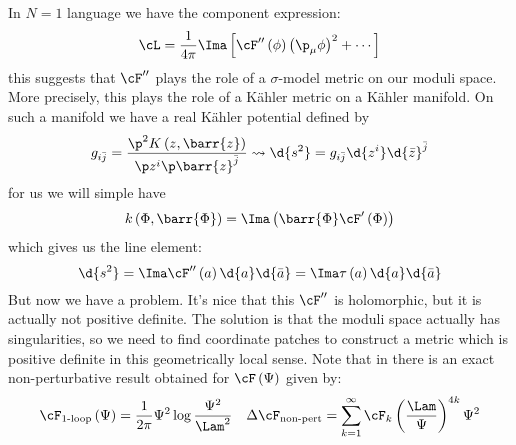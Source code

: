 \documentclass{booc}
\begin{document}
In $N = 1$ language we have the component expression:
\begin{equation}
\cL = \frac{1}{4\pi} \Ima\left[ \cF''\left( \phi \right)\left( \p_\mu \phi \right)^2 + \cdots \right]
\end{equation}
this suggests that $\cF''$ plays the role of a $\sigma$-model
metric on our moduli space.
More precisely, this plays the role of a K\"ahler metric on a K\"ahler manifold. 
On such a manifold we have a real K\"ahler potential defined by
\begin{equation}
g_{i\bar j} = \frac{\p^2 K\left( z, \barr{z} \right)}{\p z^i \p\barr{z}^{\bar j}}
\leadsto
\d{s^2} = g_{i\bar j} \d{z^i} \d{\bar z}^{\bar j}
\end{equation}
for us we will simple have
\begin{equation}
k\left( \Phi , \barr{\Phi} \right) = \Ima\left( \barr{\Phi} \cF'\left( \Phi \right) \right)
\end{equation}
which gives us the line element:
\begin{equation}
\d{s^2} = \Ima \cF''\left( a \right) \d{a}\d{\bar a}
= \Ima \tau\left( a \right) \d{a} \d{\bar a}
\end{equation}
But now we have a problem. 
It's nice that this $\cF''$ is holomorphic, but it is actually not
positive definite. 
The solution is that the moduli space actually has singularities, so
we need to find coordinate patches to construct 
a metric which is positive definite in this geometrically local sense.
Note that in \cite{seiberg_witten}
there is an exact non-perturbative result obtained 
for $\cF\left( \Psi \right)$ given by:
\begin{align}
\cF_{1\text{-loop}}\left( \Psi \right) = \frac{1}{2\pi} \Psi^2 \log\frac{\Psi^2}{\Lam^2}
&&
\Delta \cF_{\text{non-pert}} = 
\sum_{k = 1}^\infty \cF_k\left( \frac{\Lam}{\Psi} \right)^{4k} \Psi^2
\end{align}
\end{document}
